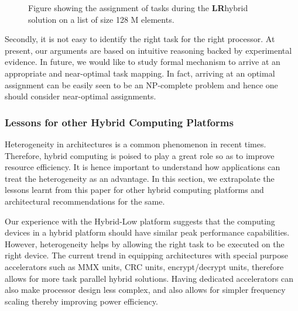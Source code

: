 \documentclass[11pt]{article}
\newcommand{\ignore}[1] {}
\newcommand{\LR} {{\bf LR}}
\begin{document}
\begin{figure}
\centering
{}
\caption{Figure showing the assignment of tasks during the \LR hybrid
solution on a list of size 128 M elements.}
\label{fig:LRwork}
\end{figure}

Secondly, it is not easy to identify the right task for the right
processor. At present, our arguments are based on intuitive reasoning backed
by experimental evidence. In future, we would like to study
formal mechanism to arrive at an appropriate and near-optimal task mapping.
In fact, arriving at an optimal assignment can be easily seen to be an
NP-complete problem and hence one should consider near-optimal
assignments.



\ignore {
\subsubsection{Programming Models}

Hybrid computing requires a significant reinterpretation of programs to
achieve performance improvements.  Current programming models offer
little support for writing hybrid programs. In all the workloads that we
implemented for this study, we used OpenMP \cite{openmp} and the CUDA
programming model for programming mutlicore CPUs and NVIDIA GPUs
respectively. In light of this, it is important that the gains in
efficiency offset the programming effort involved in writing hybrid
programs. This also suggests that one should consider developing
appropriate programming models that ease the programming effort on
hybrid computing platforms.
}


\subsubsection{Lessons for other Hybrid Computing Platforms}
Heterogeneity in architectures is a common phenomenon in
recent times. Therefore, hybrid computing is poised to
play a great role so as to improve resource efficiency. It is hence
important to understand how applications can treat
the heterogeneity as an advantage. In this section,
we extrapolate the lessons learnt from this paper for other hybrid
computing platforms and architectural recommendations for the same.

Our experience with the Hybrid-Low platform suggests that the computing
devices in a hybrid platform should have similar peak performance
capabilities. However, heterogeneity helps by allowing the right task to
be executed on the right device. The current trend in equipping
architectures with special purpose accelerators such as MMX units, CRC
units, encrypt/decrypt units, therefore allows for more task parallel
hybrid solutions. 
Having dedicated accelerators can also make processor design less
complex, and also allows for simpler frequency scaling thereby improving 
power efficiency.
\end{document}
